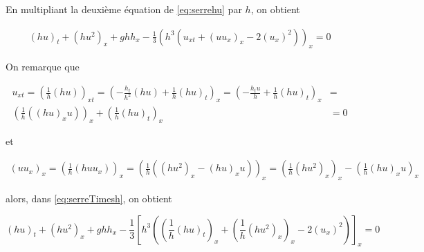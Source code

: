 \indent En multipliant la deuxième équation de \eqref{eq:serrehu} par $h$, on obtient


\begin{equation}
	\label{eq:serreTimesh}
	\begin{aligned}
	(hu)_t +  (hu^2)_x  + ghh_x - \frac{1}{3}\left(h^3 \left( u_{xt} + (uu_x)_x - 2(u_x)^2  \right) \right)_x = 0 
	\end{aligned}
\end{equation}

\indent On remarque que

\begin{equation*}
	\begin{split}
	u_{xt} = \left(\frac{1}{h} (hu) \right)_{xt} = \left( -\frac{h_t}{h^2}(hu) + \frac{1}{h}(hu)_t  \right)_x = \left( -\frac{h_tu}{h} + \frac{1}{h}(hu)_t  \right)_x &= \\ \left( \frac{1}{h} ((hu)_xu) \right)_x  + \left( \frac{1}{h}(hu)_t  \right)_x &=0
	\end{split}
\end{equation*}

\noindent et

\begin{equation*}
	\begin{split}
	(uu_x)_x = \left(  \frac{1}{h} (huu_x) \right)_x = \left(  \frac{1}{h} ((hu^2)_x - (hu)_xu) \right)_x = \left( \frac{1}{h} (hu^2)_x \right)_x - \left( \frac{1}{h} (hu)_xu \right)_x
	\end{split}
\end{equation*}

\noindent alors, dans \eqref{eq:serreTimesh}, on obtient

\begin{equation*}
	(hu)_t  + (hu^2)_x + ghh_x - \frac{1}{3}\left[h^3 \left( \left( \frac{1}{h}(hu)_t  \right)_x  + \left( \frac{1}{h} (hu^2)_x \right)_x  - 2(u_x)^2  \right) \right]_x = 0
\end{equation*}

